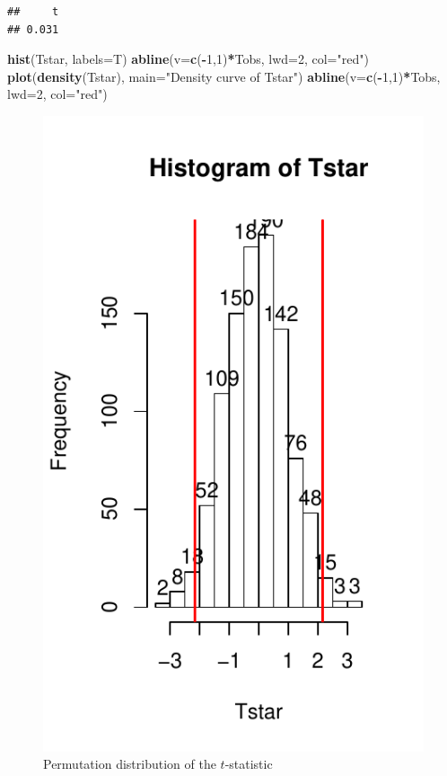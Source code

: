 \documentclass[]{book}
\newenvironment{Shaded}{\begin{snugshade}}{\end{snugshade}}
\newcommand{\KeywordTok}[1]{\textcolor[rgb]{0.13,0.29,0.53}{\textbf{#1}}}
\newcommand{\DataTypeTok}[1]{\textcolor[rgb]{0.13,0.29,0.53}{#1}}
\newcommand{\DecValTok}[1]{\textcolor[rgb]{0.00,0.00,0.81}{#1}}
\newcommand{\StringTok}[1]{\textcolor[rgb]{0.31,0.60,0.02}{#1}}
\newcommand{\OperatorTok}[1]{\textcolor[rgb]{0.81,0.36,0.00}{\textbf{#1}}}
\newcommand{\NormalTok}[1]{#1}
\theoremstyle{definition}
\theoremstyle{definition}
\theoremstyle{remark}
\begin{document}
\begin{verbatim}
##     t 
## 0.031
\end{verbatim}

\begin{Shaded}
\begin{Highlighting}[]
\KeywordTok{hist}\NormalTok{(Tstar, }\DataTypeTok{labels=}\NormalTok{T)}
\KeywordTok{abline}\NormalTok{(}\DataTypeTok{v=}\KeywordTok{c}\NormalTok{(}\OperatorTok{-}\DecValTok{1}\NormalTok{,}\DecValTok{1}\NormalTok{)}\OperatorTok{*}\NormalTok{Tobs, }\DataTypeTok{lwd=}\DecValTok{2}\NormalTok{, }\DataTypeTok{col=}\StringTok{"red"}\NormalTok{)}
\KeywordTok{plot}\NormalTok{(}\KeywordTok{density}\NormalTok{(Tstar), }\DataTypeTok{main=}\StringTok{"Density curve of Tstar"}\NormalTok{)}
\KeywordTok{abline}\NormalTok{(}\DataTypeTok{v=}\KeywordTok{c}\NormalTok{(}\OperatorTok{-}\DecValTok{1}\NormalTok{,}\DecValTok{1}\NormalTok{)}\OperatorTok{*}\NormalTok{Tobs, }\DataTypeTok{lwd=}\DecValTok{2}\NormalTok{, }\DataTypeTok{col=}\StringTok{"red"}\NormalTok{)}
\end{Highlighting}
\end{Shaded}



\begin{figure}
\centering
\includegraphics{02-reintroductionToStatistics_files/figure-latex/Figure2-12-1.pdf}
\caption{\label{fig:Figure2-12}Permutation distribution of the \(t\)-statistic}
\end{figure}
\end{document}
